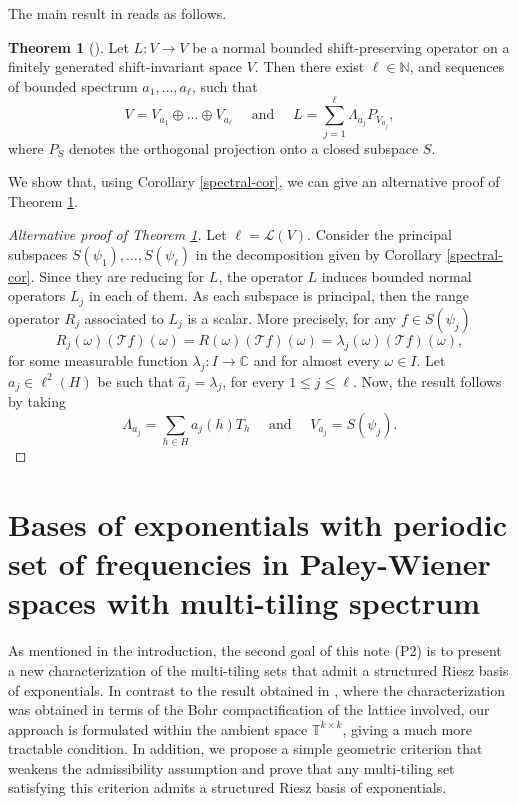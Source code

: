 \documentclass[a4paper,11pt]{amsart}
\theoremstyle{definition}
\newtheorem{teo}[fed]{Theorem}
\theoremstyle{definition}
\def\La{\Lambda}
\def\w{\omega}
\def\N{\mathbb{N}}
\def\C{\mathbb{C}}
\def\T{\mathbb{T}}
\def\ele{\mathcal{L}}
\def\ete{\mathcal{T}}
\newcommand{\peso}[1]{ \quad \mbox{  #1 } \quad }
\begin{document}
The main result in \cite{ACCP} reads as follows.

\begin{teo}[{\cite[Theorem 6.16]{ACCP}}]\label{spectral}
	Let $L :V\rightarrow V$ be a normal bounded shift-preserving operator on a finitely generated shift-invariant space $V.$
	Then there exist $\ell \in \N$, and sequences of bounded spectrum $a_1,\dots,a_\ell$,
	such that 
	$$ V=V_{a_1}\oplus\dots\oplus V_{a_\ell}\quad \text{ and }\quad L=\sum_{j=1}^\ell \Lambda_{a_j} P_{V_{a_j}},$$
	where $P_S$ denotes the orthogonal projection onto a closed subspace $S.$
\end{teo}

We show that, using Corollary \ref{spectral-cor}, we can give an alternative proof of Theorem \ref{spectral}.

\begin{proof}[Alternative proof of Theorem \ref{spectral}]
	Let $\ell=\ele(V)$. Consider the principal subspaces $S(\psi_1),\dots,S(\psi_\ell)$ in the decomposition given by Corollary \ref{spectral-cor}. Since they are reducing for $L$, the operator $L$ induces bounded normal operators $L_j$ in each of them. As each subspace is principal, then the range operator $R_j$ associated to $L_j$ is a scalar. More precisely, for any $f\in S(\psi_j)$ 
	$$
	R_j(\w)(\ete f)(\w)=R(\w)(\ete f)(\w)=\lambda_j(\w) (\ete f)(\w),
	$$
	for some measurable function $\lambda_j: I \to\C$ and for almost every $\w\in I$. Let $a_j\in \ell^2(H)$ be such that $\widehat{a}_j=\lambda_j$, for every $1\leq j \leq \ell$. 
	Now, the result follows by taking
	$$
	\La_{a_j}=\sum_{h \in H} a_j(h) T_h  \peso{and} V_{a_j}= S(\psi_j).
	$$
\end{proof}


\section{Bases of exponentials with periodic set of frequencies in Paley-Wiener spaces with multi-tiling spectrum}\label{sec-4}

As mentioned in the introduction, the second goal of this note (P2) is to present a new characterization of the multi-tiling sets that admit a structured Riesz basis of exponentials. In contrast to the result obtained in \cite{CUC}, where the characterization was obtained in terms of the Bohr compactification of the lattice involved, our approach is formulated within the ambient space $\T^{k\times k}$, giving a much more tractable condition. In addition, we propose a simple geometric criterion that weakens the admissibility assumption and prove that any multi-tiling set satisfying this criterion admits a structured Riesz basis of exponentials.
\end{document}
